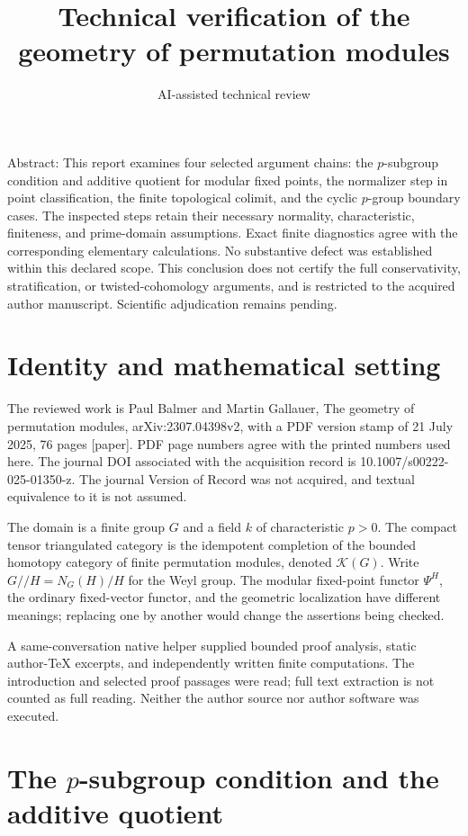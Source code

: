 \documentclass[10pt]{article}
\title{Technical verification of the geometry of permutation modules}
\author{AI-assisted technical review}
\date{}
\begin{document}
\maketitle
Abstract: This report examines four selected argument chains: the \(p\)-subgroup condition and additive quotient for modular fixed points, the normalizer step in point classification, the finite topological colimit, and the cyclic \(p\)-group boundary cases. The inspected steps retain their necessary normality, characteristic, finiteness, and prime-domain assumptions. Exact finite diagnostics agree with the corresponding elementary calculations. No substantive defect was established within this declared scope. This conclusion does not certify the full conservativity, stratification, or twisted-cohomology arguments, and is restricted to the acquired author manuscript. Scientific adjudication remains pending.\par
\section*{Identity and mathematical setting}
The reviewed work is Paul Balmer and Martin Gallauer, The geometry of permutation modules, arXiv:2307.04398v2, with a PDF version stamp of 21 July 2025, 76 pages [paper]. PDF page numbers agree with the printed numbers used here. The journal DOI associated with the acquisition record is 10.1007/s00222-025-01350-z. The journal Version of Record was not acquired, and textual equivalence to it is not assumed.\par
The domain is a finite group \(G\) and a field \(k\) of characteristic \(p>0\). The compact tensor triangulated category is the idempotent completion of the bounded homotopy category of finite permutation modules, denoted \(\mathcal K(G)\). Write \(G/\!/H=N_G(H)/H\) for the Weyl group. The modular fixed-point functor \(\Psi^H\), the ordinary fixed-vector functor, and the geometric localization have different meanings; replacing one by another would change the assertions being checked.\par
A same-conversation native helper supplied bounded proof analysis, static author-TeX excerpts, and independently written finite computations. The introduction and selected proof passages were read; full text extraction is not counted as full reading. Neither the author source nor author software was executed.\par
\section*{The \(p\)-subgroup condition and the additive quotient}
\end{document}
